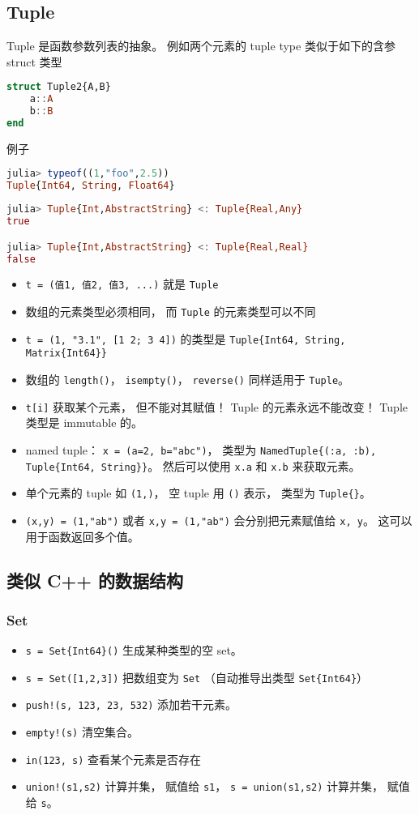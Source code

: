 \subsection{Tuple}
Tuple 是函数参数列表的抽象。 例如两个元素的 tuple type 类似于如下的含参 struct 类型
\begin{lstlisting}[language=julia]
struct Tuple2{A,B}
    a::A
    b::B
end
\end{lstlisting}
例子
\begin{lstlisting}[language=julia]
julia> typeof((1,"foo",2.5))
Tuple{Int64, String, Float64}
\end{lstlisting}
\begin{lstlisting}[language=julia]
julia> Tuple{Int,AbstractString} <: Tuple{Real,Any}
true

julia> Tuple{Int,AbstractString} <: Tuple{Real,Real}
false
\end{lstlisting}

\begin{itemize}
\item \verb|t = (值1, 值2, 值3, ...)| 就是 \verb|Tuple|
\item 数组的元素类型必须相同， 而 \verb|Tuple| 的元素类型可以不同
\item \verb|t = (1, "3.1", [1 2; 3 4])| 的类型是 \verb|Tuple{Int64, String, Matrix{Int64}}|
\item 数组的 \verb|length()|， \verb|isempty()|， \verb|reverse()| 同样适用于 \verb|Tuple|。
\item \verb|t[i]| 获取某个元素， 但不能对其赋值！ Tuple 的元素永远不能改变！ Tuple 类型是 immutable 的。
\item named tuple： \verb|x = (a=2, b="abc")|， 类型为 \verb|NamedTuple{(:a, :b), Tuple{Int64, String}}|。 然后可以使用 \verb|x.a| 和 \verb|x.b| 来获取元素。
\item 单个元素的 tuple 如 \verb|(1,)|， 空 tuple 用 \verb|()| 表示， 类型为 \verb|Tuple{}|。
\item \verb|(x,y) = (1,"ab")| 或者 \verb|x,y = (1,"ab")| 会分别把元素赋值给 \verb|x, y|。 这可以用于函数返回多个值。
\end{itemize}

\subsection{类似 C++ 的数据结构}
\subsubsection{Set}
\begin{itemize}
\item \verb|s = Set{Int64}()| 生成某种类型的空 set。
\item \verb|s = Set([1,2,3])| 把数组变为 \verb|Set| （自动推导出类型 \verb|Set{Int64}|）
\item \verb|push!(s, 123, 23, 532)| 添加若干元素。
\item \verb|empty!(s)| 清空集合。
\item \verb|in(123, s)| 查看某个元素是否存在
\item \verb|union!(s1,s2)| 计算并集， 赋值给 \verb|s1|， \verb|s = union(s1,s2)| 计算并集， 赋值给 \verb|s|。
\end{itemize}

